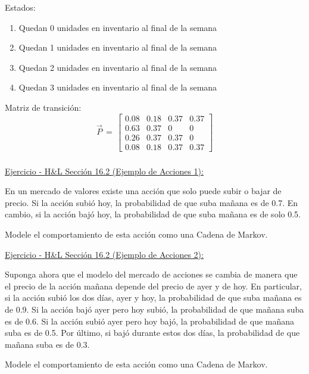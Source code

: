 \documentclass[ 10pt, xcolor = dvipsnames]{beamer}
\begin{document}
\begin{frame}[allowframebreaks]
Estados: 
\begin{enumerate}
\item Quedan 0 unidades en inventario al final de la semana
\item Quedan 1 unidades en inventario al final de la semana
\item Quedan 2 unidades en inventario al final de la semana
\item Quedan 3 unidades en inventario al final de la semana
\end{enumerate}

Matriz de transici\'on:
\[
\vec{P} \, = \, 
\left[
\begin{array}{cccc}
0.08 & 0.18 & 0.37 & 0.37 \\
0.63 & 0.37 & 0    & 0    \\
0.26 & 0.37 & 0.37 & 0    \\
0.08 & 0.18 & 0.37 & 0.37
\end{array}
\right]
\]

\framebreak

\end{frame}

\begin{frame}[allowframebreaks]
\frametitle{\insertsubsection}

\underline{Ejercicio - H\&L Secci\'on 16.2 (Ejemplo de Acciones 1):}

En un mercado de valores existe una acci\'on que solo puede subir o bajar de precio. Si la acci\'on subi\'o hoy, la probabilidad de que suba ma\~nana es de 0.7. \linebreak En cambio, si la acci\'on baj\'o hoy, la probabilidad de que suba ma\~nana es de \linebreak solo 0.5. 

Modele el comportamiento de esta acci\'on como una Cadena de Markov. 

\framebreak

\underline{Ejercicio - H\&L Secci\'on 16.2 (Ejemplo de Acciones 2):}

Suponga ahora que el modelo del mercado de acciones se cambia de manera que el precio de la acci\'on ma\~nana depende del precio de ayer y de hoy. En particular, si la acci\'on subi\'o los dos d\'ias, ayer y hoy, la probabilidad de que suba ma\~nana es de 0.9. Si la acci\'on baj\'o ayer pero hoy subi\'o, la probabilidad de que ma\~nana suba es de 0.6. Si la acci\'on subi\'o ayer pero hoy baj\'o, la probabilidad de que ma\~nana suba es de 0.5. Por \'ultimo, si baj\'o durante estos dos d\'ias, la probabilidad de que ma\~nana suba es de 0.3. 

Modele el comportamiento de esta acci\'on como una Cadena de Markov. 

\end{frame}
\end{document}
